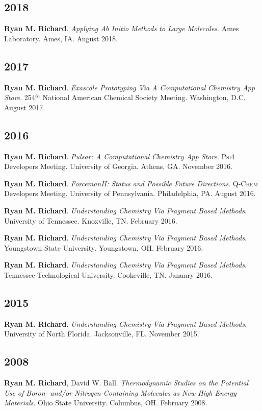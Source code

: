 \documentclass[11pt,a4paper,sans]{moderncv}
\begin{document}
\begin{etaremune}
	\subsection{2018}
	\item{\textbf{Ryan M. Richard}. \textit{Applying Ab Initio Methods to
	      Large Molecules}. Ames Laboratory.  Ames, IA. August 2018.}

	\subsection{2017}
	\item{\textbf{Ryan M. Richard}. \textit{Exascale Prototyping Via A
	      Computational Chemistry App Store}. 254$^{th}$ National American
		  Chemical Society Meeting.  Washington, D.C. August 2017.}

	\subsection{2016}
	\item{\textbf{Ryan M. Richard}. \textit{Pulsar: A Computational Chemistry 
	      App Store}. \textsc{Psi4} Developers Meeting.  University of Georgia.
		  Athens, GA.  November 2016.}
	\item{\textbf{Ryan M. Richard}. \textit{ForcemanII: Status and Possible 
	      Future Directions}.  \textsc{Q-Chem} Developers Meeting.  University 
		  of Pennsylvania. Philadelphia, PA. August 2016.}
	\item{\textbf{Ryan M. Richard}. \textit{Understanding Chemistry Via Fragment
	      Based Methods}. University of Tennessee.  Knoxville, TN.  February 
		  2016.}
	\item{\textbf{Ryan M. Richard}. \textit{Understanding Chemistry Via Fragment
	      Based Methods}. Youngstown State University.  Youngstown, OH.  
		  February 2016.}
	\item{\textbf{Ryan M. Richard}. \textit{Understanding Chemistry Via Fragment
	      Based Methods}. Tennessee Technological University.  Cookeville, TN.
		  January 2016.}
	
	\subsection{2015}
	\item{\textbf{Ryan M. Richard}. \textit{Understanding Chemistry Via Fragment
	      Based Methods}. University of North Florida.  Jacksonville, FL.  
		  November 2015.}

	\subsection{2008}
	\item{\textbf{Ryan M. Richard}, David W. Ball. \textit{Thermodynamic Studies
	      on the Potential Use of Boron- and/or Nitrogen-Containing Molecules as
		  New High Energy Materials}. Ohio State University. Columbus, OH. 
		  February 2008.}
\end{etaremune}
\end{document}
